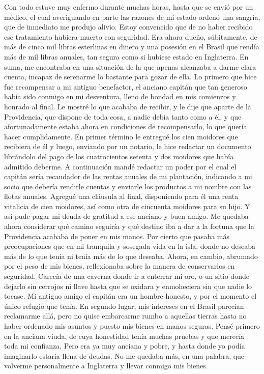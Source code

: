\documentclass{novela}
\begin{document}
    Con todo estuve muy enfermo durante muchas horas, hasta que se envió por un médico, el cual averiguando en parte las razones de mi estado ordenó una sangría, que de inmediato me produjo alivio. Estoy convencido que de no haber recibido ese tratamiento hubiera muerto con seguridad.
    Era ahora dueño, súbitamente, de más de cinco mil libras esterlinas en dinero y una posesión en el Brasil que rendía más de mil libras anuales, tan segura como si hubiese estado en Inglaterra. En suma, me encontraba en una situación de la que apenas alcanzaba a darme clara cuenta, incapaz de serenarme lo bastante para gozar de ella.
    Lo primero que hice fue recompensar a mi antiguo benefactor, el anciano capitán que tan generoso había sido conmigo en mi desventura, lleno de bondad en mis comienzos y honrado al final. Le mostré lo que acababa de recibir, y le dije que aparte de la Providencia, que dispone de toda cosa, a nadie debía tanto como a él, y que afortunadamente estaba ahora en condiciones de recompensarlo, lo que quería hacer cumplidamente. En primer término le entregué los cien moidores que recibiera de él y luego, enviando por un notario, le hice redactar un documento librándolo del pago de los cuatrocientos setenta y dos moidores que había admitido deberme. A continuación mandé redactar un poder por el cual el capitán sería recaudador de las rentas anuales de mi plantación, indicando a mi socio que debería rendirle cuentas y enviarle los productos a mi nombre con las flotas anuales. Agregué una cláusula al final, disponiendo para él una renta vitalicia de cien moidores, así como otra de cincuenta moidores para su hijo. Y así pude pagar mi deuda de gratitud a ese anciano y buen amigo.
    Me quedaba ahora considerar qué camino seguiría y qué destino iba a dar a la fortuna que la Providencia acababa de poner en mis manos. Por cierto que pasaba más preocupaciones que en mi tranquila y sosegada vida en la isla, donde no deseaba más de lo que tenía ni tenía más de lo que deseaba. Ahora, en cambio, abrumado por el peso de mis bienes, reflexionaba sobre la manera de conservarlos en seguridad. Carecía de una caverna donde ir a enterrar mi oro, o un sitio donde dejarlo sin cerrojos ni llave hasta que se oxidara y enmoheciera sin que nadie lo tocase. Mi antiguo amigo el capitán era un hombre honesto, y por el momento el único refugio que tenía.
    En segundo lugar, mis intereses en el Brasil parecían reclamarme allá, pero no quise embarcarme rumbo a aquellas tierras hasta no haber ordenado mis asuntos y puesto mis bienes en manos seguras.
    Pensé primero en la anciana viuda, de cuya honestidad tenía muchas pruebas y que merecía toda mi confianza. Pero era ya muy anciana y pobre, y hasta donde yo podía imaginarlo estaría llena de deudas. No me quedaba más, en una palabra, que volverme personalmente a Inglaterra y llevar conmigo mis bienes.
\end{document}
